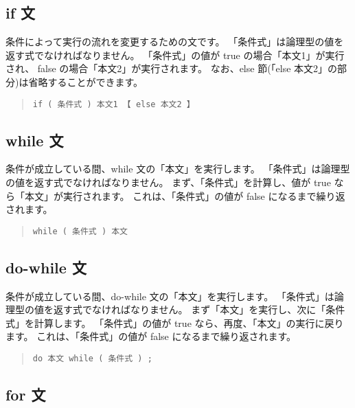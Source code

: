 \subsection{if 文}

条件によって実行の流れを変更するための文です。
「条件式」は論理型の値を返す式でなければなりません。
「条件式」の値が true の場合「本文1」が実行され、
false の場合「本文2」が実行されます。
なお、else 節(「else 本文2」の部分)は省略することができます。

\begin{quote}
\begin{verbatim}
if ( 条件式 ) 本文1 【 else 本文2 】 
\end{verbatim}
\end{quote}

\subsection{while 文}

条件が成立している間、while 文の「本文」を実行します。
「条件式」は論理型の値を返す式でなければなりません。
まず、「条件式」を計算し、値が true なら「本文」が実行されます。
これは、「条件式」の値が false になるまで繰り返されます。

\begin{quote}
\begin{verbatim}
while ( 条件式 ) 本文
\end{verbatim}
\end{quote}

\subsection{do-while 文}

条件が成立している間、do-while 文の「本文」を実行します。
「条件式」は論理型の値を返す式でなければなりません。
まず「本文」を実行し、次に「条件式」を計算します。
「条件式」の値が true なら、再度、「本文」の実行に戻ります。
これは、「条件式」の値が false になるまで繰り返されます。

\begin{quote}
\begin{verbatim}
do 本文 while ( 条件式 ) ;
\end{verbatim}
\end{quote}

\subsection{for 文}

